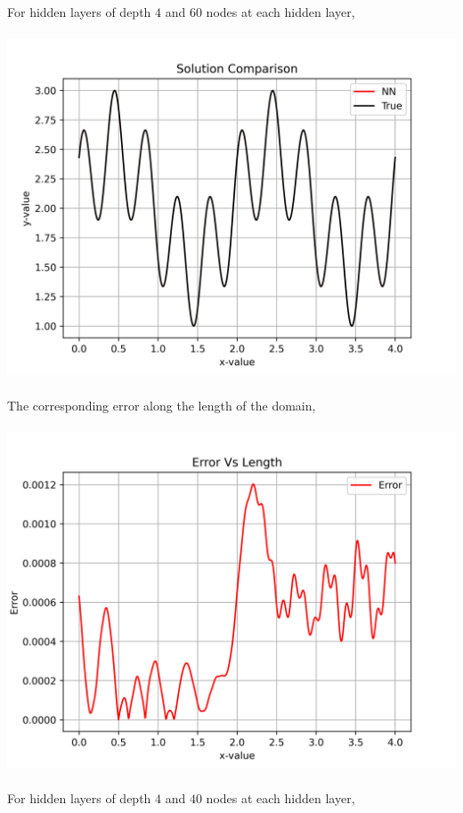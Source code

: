 \documentclass[a4paper, 12pt]{report}
\def\size{0.92}
\begin{document}
\begin{center}
\\~\\For hidden layers of depth $4$ and $60$ nodes at each hidden layer,
\\~\\\includegraphics[scale=\size]{breadthsol60.png}
\\~\\The corresponding error along the length of the domain,
\\~\\\includegraphics[scale=\size]{breadtherr60.png}
\\~\\For hidden layers of depth $4$ and $40$ nodes at each hidden layer,

\end{center}
\end{document}
